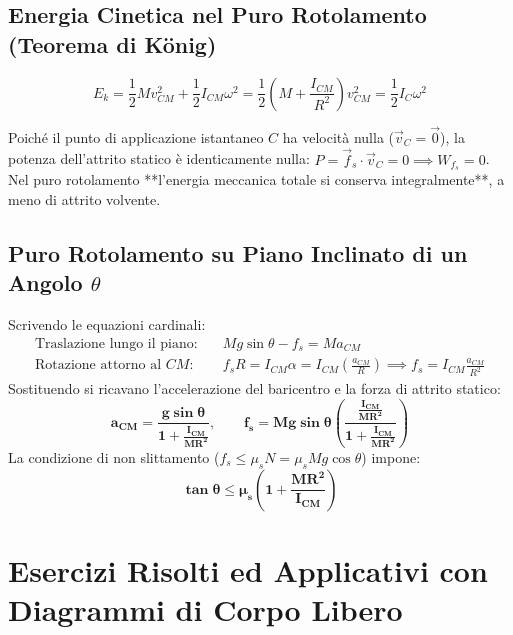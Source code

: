 \subsection{Energia Cinetica nel Puro Rotolamento (Teorema di König)}
\begin{equation}
    E_k = \frac{1}{2}M v_{CM}^2 + \frac{1}{2}I_{CM}\omega^2 = \frac{1}{2}\left(M + \frac{I_{CM}}{R^2}\right)v_{CM}^2 = \frac{1}{2}I_C \omega^2
    \label{eq:ek_rotolamento}
\end{equation}

\begin{esame}
Poiché il punto di applicazione istantaneo $C$ ha velocità nulla ($\vec{v}_C = \vec{0}$), la potenza dell'attrito statico è identicamente nulla: $P = \vec{f}_s\cdot\vec{v}_C = 0 \implies W_{f_s} = 0$.
Nel puro rotolamento **l'energia meccanica totale si conserva integralmente**, a meno di attrito volvente.
\end{esame}

\subsection{Puro Rotolamento su Piano Inclinato di un Angolo $\theta$}
Scrivendo le equazioni cardinali:
\begin{align}
    \text{Traslazione lungo il piano:} \quad & Mg\sin\theta - f_s = M a_{CM} \\
    \text{Rotazione attorno al } CM: \quad & f_s R = I_{CM}\alpha = I_{CM}\left(\frac{a_{CM}}{R}\right) \implies f_s = I_{CM}\frac{a_{CM}}{R^2}
\end{align}
Sostituendo si ricavano l'accelerazione del baricentro e la forza di attrito statico:
\begin{equation}
    \mathbf{a_{CM} = \frac{g\sin\theta}{1 + \frac{I_{CM}}{M R^2}}}, \qquad \mathbf{f_s = Mg\sin\theta\left(\frac{\frac{I_{CM}}{MR^2}}{1 + \frac{I_{CM}}{MR^2}}\right)}
    \label{eq:acm_rotolamento_piano}
\end{equation}
La condizione di non slittamento ($f_s \le \mu_s N = \mu_s Mg\cos\theta$) impone:
\begin{equation}
    \mathbf{\tan\theta \le \mu_s \left(1 + \frac{MR^2}{I_{CM}}\right)}
\end{equation}

\section{Esercizi Risolti ed Applicativi con Diagrammi di Corpo Libero}
\label{sec:esercizi_corpo_rigido}

